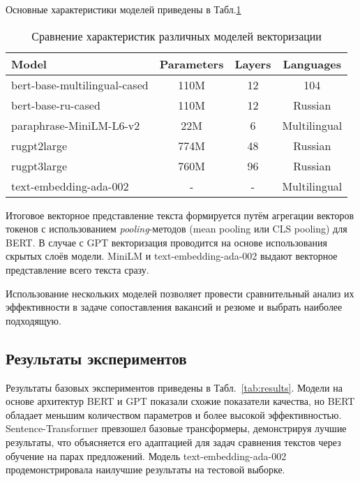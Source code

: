 \documentclass{article}
\begin{document}
Основные характеристики моделей приведены в Табл.\ref{tab:models_comparison}

\begin{table}[h!]
\centering
\begin{tabular}{|l|c|c|c|}
\hline
\textbf{Model}                  & \textbf{Parameters} & \textbf{Layers} & \textbf{Languages} \\ \hline
bert-base-multilingual-cased    & 110M                & 12              & 104                \\ \hline
bert-base-ru-cased              & 110M                & 12              & Russian            \\ \hline
paraphrase-MiniLM-L6-v2         & 22M                 & 6               & Multilingual       \\ \hline
rugpt2large                     & 774M                & 48              & Russian            \\ \hline
rugpt3large                     & 760M                & 96              & Russian            \\ \hline
text-embedding-ada-002          & -                   & -               & Multilingual       \\ \hline
\end{tabular}
\caption{Сравнение характеристик различных моделей векторизации}
\label{tab:models_comparison}
\end{table}

Итоговое векторное представление текста формируется путём агрегации векторов токенов с использованием \textit{pooling}-методов (mean pooling или CLS pooling) для BERT. В случае с GPT векторизация проводится на основе использования скрытых слоёв модели. MiniLM и text-embedding-ada-002 выдают векторное представление всего текста сразу.


Использование нескольких моделей позволяет провести сравнительный анализ их эффективности в задаче сопоставления вакансий и резюме и выбрать наиболее подходящую.  

\subsection{Результаты экспериментов}

Результаты базовых экспериментов приведены в Табл.~\ref{tab:results}. Модели на основе архитектур BERT и GPT показали схожие показатели качества, но BERT обладает меньшим количеством параметров и более высокой эффективностью. Sentence-Transformer превзошел базовые трансформеры, демонстрируя лучшие результаты, что объясняется его адаптацией для задач сравнения текстов через обучение на парах предложений. Модель text-embedding-ada-002 продемонстрировала наилучшие результаты на тестовой выборке.
\end{document}
